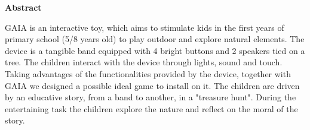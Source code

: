 \documentclass[a4paper,11pt]{report}
\begin{document}
\begin{titlepage}
\begin{center}
	{\textbf{\Large{Abstract}}}
\end{center}
\par 
GAIA is an interactive toy, which aims to stimulate kids in the first years of primary
school (5/8 years old) to play outdoor and explore natural elements. The device is a tangible band
equipped with 4 bright buttons and 2 speakers tied on a tree. The children interact with the
device through lights, sound and touch. Taking advantages of the
functionalities provided by the device, together with GAIA we designed a possible ideal game to install on it.
The children are driven by an educative story, from a band to another, in a "treasure hunt".
During the entertaining task the children explore the nature and reflect on the moral of the
story.
\end{titlepage}
\end{document}

